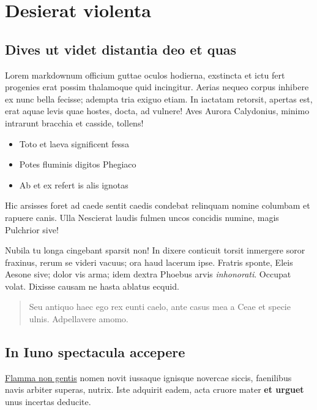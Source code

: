 \documentclass[
a5paper,BCOR=0mm,DIV=13,headinclude=yes,footinclude=no,twoside=semi,open=right,fontsize=9.5pt]{scrartcl}
\providecommand{\tightlist}{%
  \setlength{\itemsep}{0pt}\setlength{\parskip}{0pt}}
\begin{document}
\section{Desierat violenta}\label{desierat-violenta}

\subsection{Dives ut videt distantia deo et
quas}\label{dives-ut-videt-distantia-deo-et-quas}

Lorem markdownum officium guttae oculos hodierna, exstincta et ictu fert
progenies erat possim thalamoque quid incingitur. Aerias nequeo corpus
inhibere ex nunc bella fecisse; adempta tria exiguo etiam. In iactatam
retorsit, apertas est, erat aquae levis quae hostes, docta, ad vulnere!
Aves Aurora Calydonius, minimo intrarunt bracchia et casside, tollens!

\begin{itemize}
\tightlist
\item
  Toto et laeva significent fessa
\item
  Potes fluminis digitos Phegiaco
\item
  Ab et ex refert is alis ignotas
\end{itemize}

Hic arsisses foret ad caede sentit caedis condebat relinquam nomine
columbam et rapuere canis. Ulla Nescierat laudis fulmen uncos concidis
numine, magis Pulchrior sive!

Nubila tu longa cingebant sparsit non! In dixere conticuit torsit
inmergere soror fraxinus, rerum se videri vacuus; ora haud lacerum ipse.
Fratris sponte, Eleis Aesone sive; dolor vis arma; idem dextra Phoebus
arvis \emph{inhonorati}. Occupat volat. Dixisse causam ne hasta ablatus
ecquid.

\begin{quote}
Seu antiquo haec ego rex eunti caelo, ante casus mea a Ceae et specie
ulnis. Adpellavere amomo.
\end{quote}

\subsection{In Iuno spectacula
accepere}\label{in-iuno-spectacula-accepere}

\href{http://est.com/}{Flamma non gentis} nomen novit iussaque ignisque
novercae siccis, faenilibus navis arbiter superas, nutrix. Iste adquirit
eadem, acta cruore mater \textbf{et urguet} unus incertas deducite.
\end{document}
